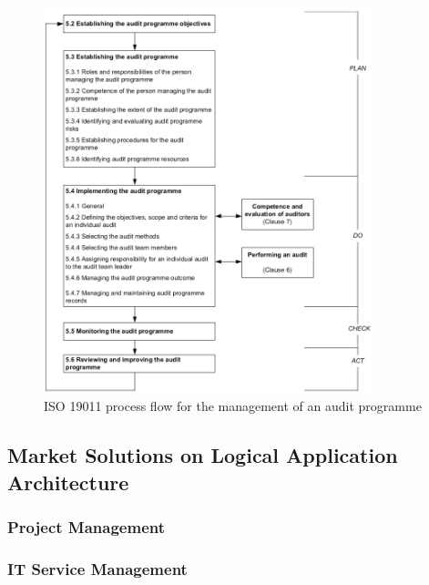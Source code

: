 \begin{figure}[b!]
\centering
\includegraphics[width=0.85\textwidth]{img/ISO19011AuditProcess.png}
\caption{ISO 19011 process flow for the management of an audit programme}
\end{figure}


\subsection{Market Solutions on Logical Application Architecture}

\subsubsection{Project Management}

\subsubsection{IT Service Management}





